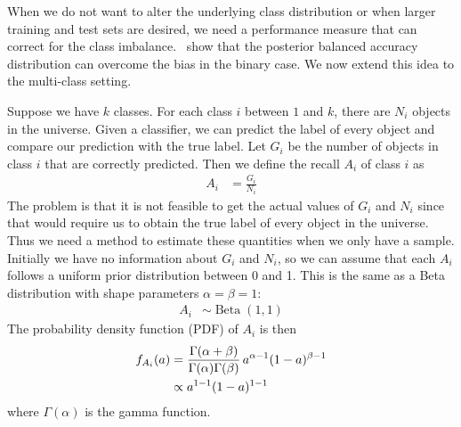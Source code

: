 \documentclass[fleqn,10pt,lineno]{wlpeerj} %
\DeclareMathOperator{\Beta}{Beta}
\providecommand{\DIFdelbegin}{} %
\providecommand{\DIFdelend}{} %
\begin{document}
When we do not want to alter the underlying class distribution or when larger
training and test sets are desired, we need a performance measure that can
correct for the class imbalance.~\cite{brodersen10} show that the posterior
balanced accuracy distribution can overcome the bias in the binary case. We now
extend this idea to the multi-class setting.

Suppose we have $k$ classes. For each class $i$ between $1$ and $k$, there are
$N_i$ objects in the universe. Given a classifier, we can predict the label of
every object and compare our prediction with the true label. Let $G_i$ be the
number of objects in class $i$ that are correctly predicted.
Then we define the recall $A_i$ of class $i$ as
	\begin{align}
		A_i &= \frac{G_i}{N_i}
	\end{align}
The problem is that it is not feasible to get the actual values of $G_i$ and
$N_i$ since that would require us to obtain the true label of every object in
the universe. Thus we need a method to estimate these quantities when we only
have a sample. Initially we have no information about $G_i$ and $N_i$, so we
can assume that each $A_i$ follows a uniform prior distribution between 0 and
1. This is the same as a Beta distribution with shape parameters $\alpha =
\beta = 1$:
	\begin{align}
		A_i &\sim \DIFdelbegin %
\DIFdelend \Beta(1,1)
	\end{align}
The probability density function (PDF) of $A_i$ is then
    \begin{align}
        f_{A_i}(a) &= \frac{\Gamma(\alpha+\beta)}{\Gamma(\alpha)\Gamma(\beta)}\,
        a^{\alpha-1}(1-a)^{\beta-1} \label{eqn:prior} \\
        &\propto   \DIFdelbegin %
\DIFdelend a^{1-1}(1-a)^{1-1}  \notag
    \end{align}
where $\Gamma(\alpha)$ is the gamma function.
\end{document}
